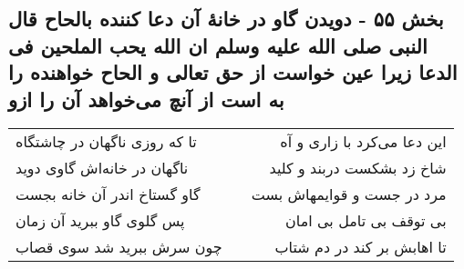 \begin{center}
\section*{بخش ۵۵ - دویدن گاو در خانهٔ آن دعا کننده بالحاح قال النبی صلی الله علیه وسلم ان الله یحب الملحین فی الدعا زیرا عین خواست از حق تعالی و الحاح خواهنده را به است از آنچ  می‌خواهد آن را ازو}
\label{sec:sh055}
\begin{longtable}{l p{0.5cm} r}
تا که روزی ناگهان در چاشتگاه
&&
این دعا می‌کرد با زاری و آه
\\
ناگهان در خانه‌اش گاوی دوید
&&
شاخ زد بشکست دربند و کلید
\\
گاو گستاخ اندر آن خانه بجست
&&
مرد در جست و قوایمهاش بست
\\
پس گلوی گاو ببرید آن زمان
&&
بی توقف بی تامل بی امان
\\
چون سرش ببرید شد سوی قصاب
&&
تا اهابش بر کند در دم شتاب
\\
\end{longtable}
\end{center}
